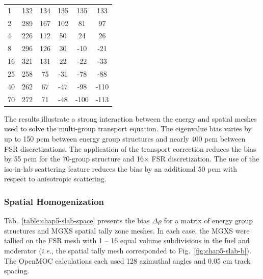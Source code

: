 \begin{table}[h!]
\begin{tabular}{a S[table-format=6.1] S[table-format=6.1] S[table-format=6.1] S[table-format=6.1] S[table-format=6.1]}
1 & 132 & 134 & 135 & 135 & 133 \\
2 & 289 & 167 & 102 & 81 & 97 \\
4 & 226 & 112 & 50 & 24 & 26 \\
8 & 296 & 126 & 30 & -10 & -21 \\
16 & 321 & 131 & 22 & -22 & -33 \\
25 & 258 & 75 & -31 & -78 & -88 \\
40 & 262 & 67 & -47 & -98 & -110 \\
70 & 272 & 71 & -48 & -100 & {} -113 \\
  \bottomrule
\end{tabular}
\end{table}

The results illustrate a strong interaction between the energy and spatial meshes used to solve the multi-group transport equation. The eigenvalue bias varies by up to 150 \ac{pcm} between energy group structures and nearly 400 \ac{pcm} between \ac{FSR} discretizations. The application of the transport correction reduces the bias by 55 \ac{pcm} for the 70-group structure and 16$\times$ \ac{FSR} discretization. The use of the iso-in-lab scattering feature reduces the bias by an additional 50 \ac{pcm} with respect to anisotropic scattering. 

\subsubsection{Spatial Homogenization}
\label{subsubsec:chap5-slab-space}

Tab.~\ref{table:chap5-slab-space} presents the bias $\Delta\rho$ for a matrix of energy group structures and \ac{MGXS} spatial tally zone meshes. In each case, the \ac{MGXS} were tallied on the \ac{FSR} mesh with 1 -- 16 equal volume subdivisions in the fuel and moderator (\textit{i.e.}, the spatial tally mesh corresponded to Fig.~\ref{fig:chap5-slab-b}). The OpenMOC calculations each used 128 azimuthal angles and 0.05 cm track spacing.

